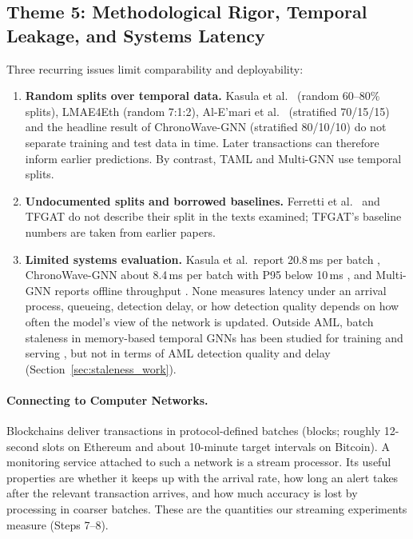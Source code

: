 \documentclass[11pt,a4paper]{article}
\begin{document}
\subsection{Theme 5: Methodological Rigor, Temporal Leakage, and Systems Latency}
Three recurring issues limit comparability and deployability:
\begin{enumerate}[leftmargin=*]
    \item \textbf{Random splits over temporal data.} Kasula et al.\ \cite{kasula2025ajk} (random 60--80\% splits), LMAE4Eth \cite{jia2025lmae4eth} (random 7:1:2), Al-E'mari et al.\ \cite{alemari2026explainable} (stratified 70/15/15) and the headline result of ChronoWave-GNN \cite{lin2026chronowave} (stratified 80/10/10) do not separate training and test data in time. Later transactions can therefore inform earlier predictions. By contrast, TAML \cite{rico2026taml} and Multi-GNN \cite{egressy2024multigraph} use temporal splits.
    \item \textbf{Undocumented splits and borrowed baselines.} Ferretti et al.\ \cite{ferretti2025aml} and TFGAT \cite{li2025tfgat} do not describe their split in the texts examined; TFGAT's baseline numbers are taken from earlier papers.
    \item \textbf{Limited systems evaluation.} Kasula et al.\ report 20.8\,ms per batch \cite{kasula2025ajk}, ChronoWave-GNN about 8.4\,ms per batch with P95 below 10\,ms \cite{lin2026chronowave}, and Multi-GNN reports offline throughput \cite{egressy2024multigraph}. None measures latency under an arrival process, queueing, detection delay, or how detection quality depends on how often the model's view of the network is updated. Outside AML, batch staleness in memory-based temporal GNNs has been studied for training and serving \cite{su2024pres,zhou2025badgnn,anchorrm2026,streamtgn2026}, but not in terms of AML detection quality and delay (Section~\ref{sec:staleness_work}).
\end{enumerate}

\paragraph{Connecting to Computer Networks.} Blockchains deliver transactions in protocol-defined batches (blocks; roughly 12-second slots on Ethereum and about 10-minute target intervals on Bitcoin). A monitoring service attached to such a network is a stream processor. Its useful properties are whether it keeps up with the arrival rate, how long an alert takes after the relevant transaction arrives, and how much accuracy is lost by processing in coarser batches. These are the quantities our streaming experiments measure (Steps 7--8).
\end{document}
